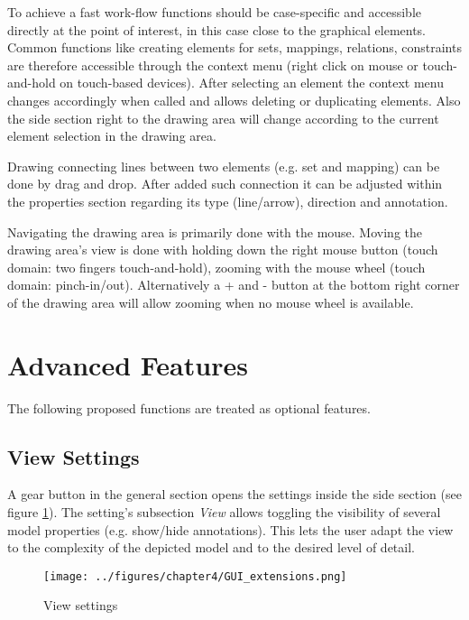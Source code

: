 \documentclass[twoside, openright, 12pt]{book}
\begin{document}
To achieve a fast work-flow functions should be case-specific and accessible directly at the point of interest, in this case close to the graphical elements.
Common functions like creating elements for sets, mappings, relations, constraints are therefore accessible through the context menu (right click on mouse or touch-and-hold on touch-based devices).
After selecting an element the context menu changes accordingly when called and allows deleting or duplicating elements.
Also the side section right to the drawing area will change according to the current element selection in the drawing area.

Drawing connecting lines between two elements (e.g. set and mapping) can be done by drag and drop.
After added such connection it can be adjusted within the properties section regarding its type (line/arrow), direction and annotation.

Navigating the drawing area is primarily done with the mouse.
Moving the drawing area's view is done with holding down the right mouse button (touch domain: two fingers touch-and-hold), zooming with the mouse wheel (touch domain: pinch-in/out).
Alternatively a + and - button at the bottom right corner of the drawing area will allow zooming when no mouse wheel is available.




\section{Advanced Features}
\label{editor_extensions}
The following proposed functions are treated as optional features.

\subsection{View Settings}
\label{editor_extension_settings}
A gear button in the general section opens the settings inside the side section (see figure \ref{fig:GUI_extensions}).
The setting's subsection \textit{View} allows toggling the visibility of several model properties (e.g. show/hide annotations).
This lets the user adapt the view to the complexity of the depicted model and to the desired level of detail.

\begin{figure}[htb]
	\centering
	\texttt{[image: ../figures/chapter4/GUI\_extensions.png]}
	\caption{View settings}
	\label{fig:GUI_extensions}
\end{figure}
\end{document}
